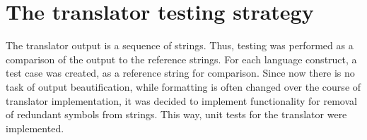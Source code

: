\section{The translator testing strategy}
The translator output is a sequence of strings. Thus, testing was performed as a comparison of the output to the reference strings. For each language construct, a test case was created, as a reference string for comparison. Since now there is no task of output beautification, while formatting is often changed over the course of translator implementation, it was decided to implement functionality for removal of redundant symbols from strings. This way, unit tests for the translator were implemented.
